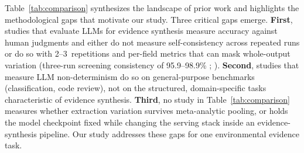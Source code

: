 \documentclass[preprint,review,12pt,authoryear]{elsarticle}
\begin{document}
Table~\ref{tab:comparison} synthesizes the landscape of prior work and highlights the methodological gaps that motivate our study.
Three critical gaps emerge.
\textbf{First}, studies that evaluate LLMs for evidence synthesis \citep{oami2024screening,gartlehner2024extraction,jensen2025chatgpt,matsui2024screening} measure accuracy against human judgments and either do not measure self-consistency across repeated runs or do so with 2--3~repetitions and per-field metrics that can mask whole-output variation (three-run screening consistency of 95.9--98.9\% ; \citealp{oami2025optimal}).
\textbf{Second}, studies that measure LLM non-determinism \citep{atil2024nondeterminism,klishevich2025codereview,fu2026beyond} do so on general-purpose benchmarks (classification, code review), not on the structured, domain-specific tasks characteristic of evidence synthesis.
\textbf{Third}, no study in Table~\ref{tab:comparison} measures whether extraction variation survives meta-analytic pooling, or holds the model checkpoint fixed while changing the serving stack inside an evidence-synthesis pipeline.
Our study addresses these gaps for one environmental evidence task.
\end{document}
